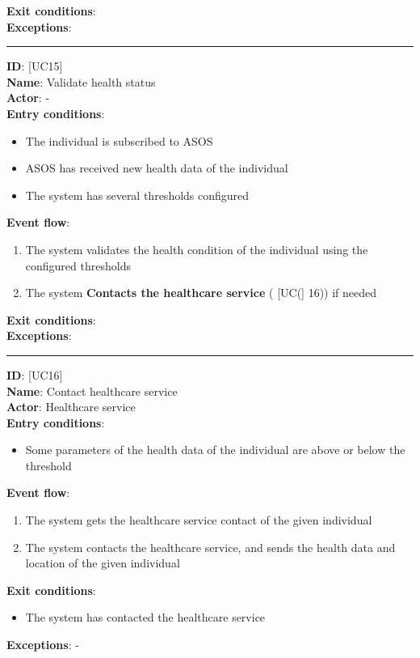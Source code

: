 \documentclass[a4paper, hidelinks, 12pt]{report}
\newcommand\usecase[1]{ [UC#1] }
\begin{document}
\begin{itemize}
		\textbf{Exit conditions}: \\
		\textbf{Exceptions}: \\
		\rule{\linewidth}{0.4pt}
		\textbf{ID}: \usecase{15} \\
		\textbf{Name}: Validate health status \\
		\textbf{Actor}: - \\
		\textbf{Entry conditions}:
		\begin{itemize}
			\item{The individual is subscribed to ASOS}
			\item{ASOS has received new health data of the individual}
			\item{The system has several thresholds configured}
		\end{itemize}
		\textbf{Event flow}:
		\begin{enumerate}
			\item{The system validates the health condition of the individual using the configured thresholds}
			\item{The system \textbf{Contacts the healthcare service} (\usecase(16)) if needed}
		\end{enumerate}
		\textbf{Exit conditions}: \\
		\textbf{Exceptions}: \\
		\rule{\linewidth}{0.4pt}
		\textbf{ID}: \usecase{16} \\
		\textbf{Name}: Contact healthcare service \\
		\textbf{Actor}: Healthcare service \\
		\textbf{Entry conditions}:
		\begin{itemize}
			\item{Some parameters of the health data of the individual are above or below the threshold}
		\end{itemize}
		\textbf{Event flow}:
		\begin{enumerate}
			\item{The system gets the healthcare service contact of the given individual}
			\item{The system contacts the healthcare service, and sends the health data and location of the given individual}
		\end{enumerate}
		\textbf{Exit conditions}:
		\begin{itemize}
			\item{The system has contacted the healthcare service}
		\end{itemize}
		\textbf{Exceptions}: - \\

\end{itemize}
\end{document}
